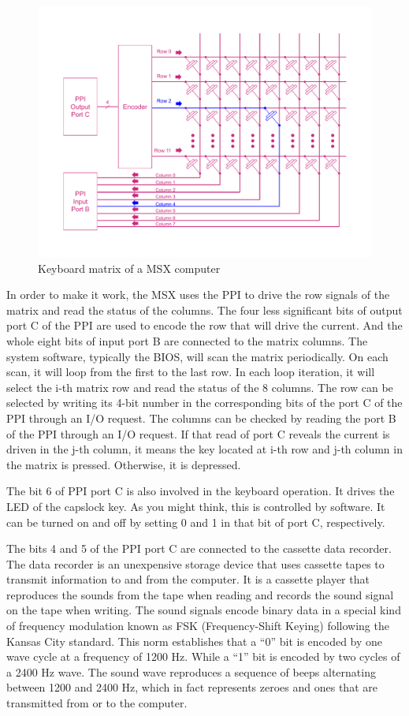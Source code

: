 \begin{figure}
	\centering
	\includegraphics[width=1\linewidth,trim={0cm 5 0 0 40}]{images/figures/msx-arch-kbmatrix}
	\caption{Keyboard matrix of a MSX computer}
	\label{fig:msx-arch-kbmatrix}
\end{figure}

In order to make it work, the MSX uses the PPI to drive the row signals of the matrix and read the status of the columns.  The four less significant bits of output port C of the PPI are used to encode the row that will drive the current. And the whole eight bits of input port B are connected to the matrix columns. The system software, typically the BIOS, will scan the matrix periodically. On each scan, it will loop from the first to the last row. In each loop iteration, it will select the i-th matrix row and read the status of the 8 columns. The row can be selected by writing its 4-bit number in the corresponding bits of the port C of the PPI through an I/O request. The columns can be checked by reading the port B of the PPI through an I/O request. If that read of port C reveals the current is driven in the j-th column, it means the key located at i-th row and j-th column in the matrix is pressed. Otherwise, it is depressed. 

The bit 6 of PPI port C is also involved in the keyboard operation. It drives the LED of the capslock key. As you might think, this is controlled by software. It can be turned on and off by setting 0 and 1 in that bit of port C, respectively. 

The bits 4 and 5 of the PPI port C are connected to the cassette data recorder. The data recorder is an unexpensive storage device that uses cassette tapes to transmit information to and from the computer. It is a cassette player that reproduces the sounds from the tape when reading and records the sound signal on the tape when writing. The sound signals encode binary data in a special kind of frequency modulation known as FSK (Frequency-Shift Keying) following the Kansas City standard. This norm establishes that a “0” bit is encoded by one wave cycle at a frequency of 1200 Hz. While a “1” bit is encoded by two cycles of a 2400 Hz wave. The sound wave reproduces a sequence of beeps alternating between 1200 and 2400 Hz, which in fact represents zeroes and ones that are transmitted from or to the computer. 

